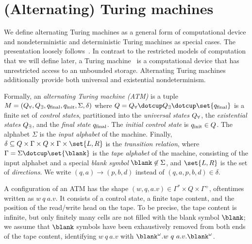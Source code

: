 \documentclass[../../diss.tex]{subfiles}
\begin{document}
\section{(Alternating) Turing machines}%
\label{Section:ATMs}%

We define alternating Turing machines as a general form of computational device and nondeterministic and deterministic Turing machines as special cases.
The presentation loosely follows~\cite{Kozen06}.
In contrast to the restricted models of computation that we will define later, a Turing machine~\cite{Turing36} is a computational device that has unrestricted access to an unbounded storage.
Alternating Turing machines~\cite{ChandraKS81} additionally provide both universal and existential nondeterminism.

    Formally, an \emph{alternating Turing machine (ATM)} is a tuple
    \(
        M = (Q_\forall, Q_\exists, q_{\text{final}}, q_{\text{init}}, \Sigma, \delta)
    \)
    where
    $Q = Q_\all \dotcup Q_\ex \dotcup \set{ q_\final}$ is a finite set of \emph{control states}, partitioned into the \emph{universal states} $Q_\forall$, the \emph{existential states} $Q_\exists$, and the \emph{final state} $q_{\text{final}}$.
    The \emph{initial control state} is $q_{\text{init}} \in Q$.
    The alphabet $\Sigma$ is the \emph{input alphabet} of the machine.
    Finally, $\delta \subseteq Q \times \Gamma \times Q \times \Gamma \times \set{L,R}$ is the \emph{transition relation}, where $\Gamma = \Sigma \dotcup \set{ \blank }$ is the \emph{tape alphabet} of the machine, consisting of the input alphabet and a special \emph{blank symbol} $\blank \not\in \Sigma$, and $\set{L,R}$ is the set of \emph{directions}.
%
We write $(q,a) \to (p,b,d)$ instead of $(q,a,p,b,d) \in \delta$.

A configuration of an ATM has the shape $(w,q,a.v) \in \Gamma^* \times Q \times \Gamma^+$, oftentimes written as $w \ q \ a.v$.
It consists of a control state, a finite tape content, and the position of the read/write head on the tape.
To be precise, the tape content is infinite, but only finitely many cells are not filled with the blank symbol $\blank$; we assume that $\blank$ symbols have been exhaustively removed from both ends of the tape content, identifying $w \ q \ a.v$ with $\blank^\omega.w \ q \ a.v.\blank^\omega$.
\end{document}
